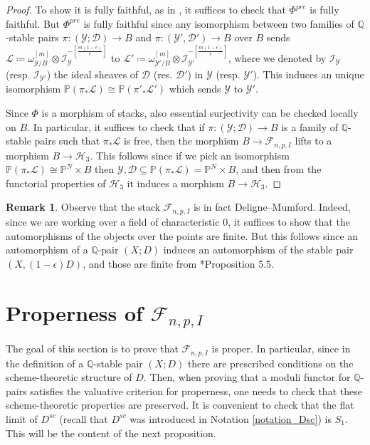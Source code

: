 \documentclass{amsart}
\newcommand{\bP}{\mathbb{P}}
\newcommand{\bQ}{\mathbb{Q}}
\newcommand{\sD}{\mathscr{D}}
\newcommand{\sF}{\mathscr{F}}
\newcommand{\sH}{\mathscr{H}}
\newcommand{\sI}{\mathscr{I}}
\newcommand{\sL}{\mathscr{L}}
\newcommand{\sY}{\mathscr{Y}}
\theoremstyle{definition}
\newtheorem{Remark}[theorem]{Remark}
\begin{document}
\begin{proof}
To show it is fully faithful, as in \cite{Alp21}, it suffices to check that $\Phi^{pre}$ is fully faithful.
But $\Phi^{pre}$ is fully faithful since any isomorphism between two families of $\bQ$-stable
pairs $\pi \colon (\sY;\sD)\to B$ and $\pi \colon (\sY',\sD')\to B$ over $B$ sends $\sL \coloneqq \omega_{\sY/B}^{[m]} \otimes \sI_{\sY}^{-[\frac{m(1-\epsilon)}{r}]}$ to $\sL' \coloneqq\omega_{\sY'/B}^{[m]} \otimes \sI_{\sY'}^{-[\frac{m(1-\epsilon)}{r}]}$, where we denoted by $ \sI_{\sY}$ (resp. $\sI_{\sY'}$) the ideal sheaves of $\sD$ (res. $\sD'$) in $\sY$ (resp. $\sY'$). This induces an unique isomorphism $\bP(\pi_*\sL )\cong \bP(\pi'_*\sL')$ which sends $\sY$ to $\sY'$.

Since $\Phi$ is a morphism of stacks, also essential surjectivity can be checked locally on $B$.
In particular, it suffices to check that if $\pi \colon (\sY;\sD)\to B$ is a family of $\bQ$-stable pairs such that $\pi_*\sL$ is free, then the morphism $B\to \sF_{n,p,I}$ lifts to a morphism $B\to \sH_3$.
This follows since if we pick an isomorphism $\bP (\pi_*\sL)\cong \bP^N \times B$ then
$\sY, \sD\subseteq \bP (\pi_*\sL) = \bP^N\times B$, and then from the functorial properties of $\sH_3$ it induces a morphism $B\to \sH_3$.
\end{proof}
\begin{Remark}
Observe that the stack $\sF_{n,p,I}$ is in fact Deligne--Mumford.
Indeed, since we are working over a field of characteristic 0, it suffices to show that the automorphisms of the objects over the points are finite. But this follows since an automorphism of a $\bQ$-pair $(X;D)$ induces an automorphism of the stable pair $(X,(1-\epsilon)D)$, and those are finite from \cite{KP17}*{Proposition 5.5}.
\end{Remark}

\section{Properness of $\sF_{n,p,I}$}\label{section_properness}
The goal of this section is to prove that $\sF_{n,p,I}$ is proper.
In particular, since in the definition of a $\bQ$-stable pair $(X;D)$ there are prescribed conditions on the scheme-theoretic structure of $D$.
Then, when proving that a moduli functor for $\bQ$-pairs satisfies the valuative criterion for properness, one needs to check that these scheme-theoretic properties are preserved.
It is convenient to check that the flat limit of $D^{sc}$ (recall that $D^{sc}$ was introduced in Notation \ref{notation_Dsc}) is $S_1$.
This will be the content of the next proposition.
\end{document}
